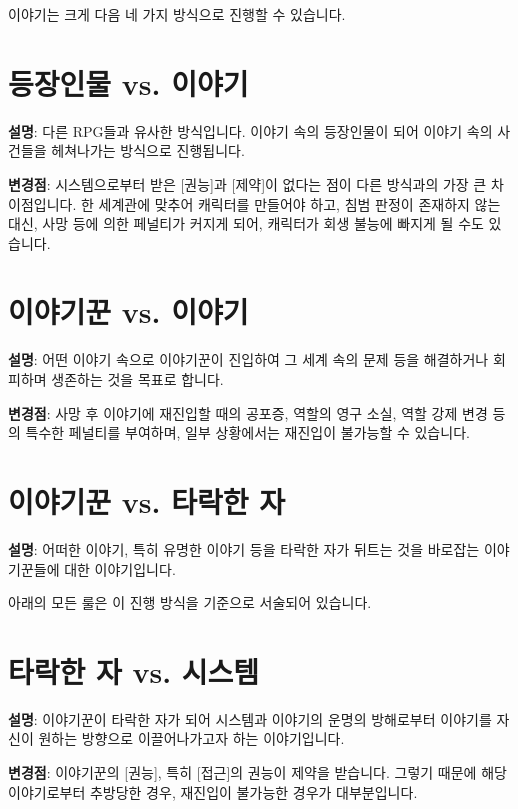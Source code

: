 \documentclass[12pt]{report}
\begin{document}
	\bigskip
	
	이야기는 크게 다음 네 가지 방식으로 진행할 수 있습니다.
	
	\section*{등장인물 vs. 이야기}
	\textbf{설명}: 다른 RPG들과 유사한 방식입니다. 이야기 속의 등장인물이 되어 이야기 속의 사건들을 헤쳐나가는 방식으로 진행됩니다.
	
	\textbf{변경점}: 시스템으로부터 받은 [권능]과 [제약]이 없다는 점이 다른 방식과의 가장 큰 차이점입니다. 한 세계관에 맞추어 캐릭터를 만들어야 하고, 침범 판정이 존재하지 않는 대신, 사망 등에 의한 페널티가 커지게 되어, 캐릭터가 회생 불능에 빠지게 될 수도 있습니다.
	
	\section*{이야기꾼 vs. 이야기}
	\textbf{설명}: 어떤 이야기 속으로 이야기꾼이 진입하여 그 세계 속의 문제 등을 해결하거나 회피하며 생존하는 것을 목표로 합니다.
	
	\textbf{변경점}: 사망 후 이야기에 재진입할 때의 공포증, 역할의 영구 소실, 역할 강제 변경 등의 특수한 페널티를 부여하며, 일부 상황에서는 재진입이 불가능할 수 있습니다.
	
	\section*{이야기꾼 vs. 타락한 자}
	\textbf{설명}: 어떠한 이야기, 특히 유명한 이야기 등을 타락한 자가 뒤트는 것을 바로잡는 이야기꾼들에 대한 이야기입니다.
	
	아래의 모든 룰은 이 진행 방식을 기준으로 서술되어 있습니다.
	
	\section*{타락한 자 vs. 시스템}
	\textbf{설명}: 이야기꾼이 타락한 자가 되어 시스템과 이야기의 운명의 방해로부터 이야기를 자신이 원하는 방향으로 이끌어나가고자 하는 이야기입니다.
	
	\textbf{변경점}: 이야기꾼의 [권능], 특히 [접근]의 권능이 제약을 받습니다. 그렇기 때문에 해당 이야기로부터 추방당한 경우, 재진입이 불가능한 경우가 대부분입니다.
	
	\bigskip
	
\end{document}
